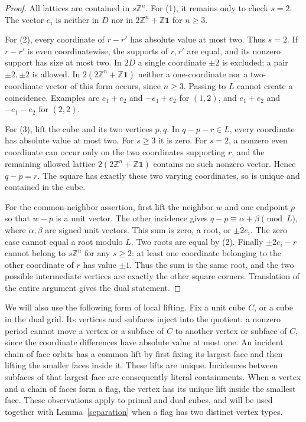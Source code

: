\documentclass[11pt,a4paper]{article}
\newcommand{\Z}{\mathbb Z}
\newcommand{\one}{\mathbf1}
\begin{document}
\begin{proof}
All lattices are contained in $s\Z^n$. For (1), it remains only to
check $s=2$. The vector $e_i$ is neither in $D$ nor in
$2\Z^n+\Z\one$ for $n\ge3$.

For (2), every coordinate of $r-r'$ has absolute value at most two.
Thus $s=2$. If $r-r'$ is even coordinatewise, the supports of $r,r'$
are equal, and its nonzero support has size at most two. In $2D$ a
single coordinate $\pm2$ is excluded; a pair $\pm2,\pm2$ is allowed.
In $2(2\Z^n+\Z\one)$ neither a one-coordinate nor a two-coordinate
vector of this form occurs, since $n\ge3$. Passing to $L$ cannot
create a coincidence. Examples are $e_1+e_2$ and $-e_1+e_2$ for
$(1,2)$, and $e_1+e_2$ and $-e_1-e_2$ for $(2,2)$.

For (3), lift the cube and its two vertices $p,q$. In
$q-p-r\in L$, every coordinate has absolute value at most two.
For $s\ge3$ it is zero. For $s=2$, a nonzero even coordinate
can occur only on the two coordinates supporting $r$, and the
remaining allowed lattice $2(2\Z^n+\Z\one)$ contains no such
nonzero vector. Hence $q-p=r$. The square has exactly these two
varying coordinates, so is unique and contained in the cube.

For the common-neighbor assertion, first lift the neighbor $w$ and
one endpoint $p$ so that $w-p$ is a unit vector. The other incidence
gives $q-p\equiv\alpha+\beta\pmod L$, where $\alpha,\beta$ are
signed unit vectors. This sum is zero, a root, or $\pm2e_i$.
The zero case cannot equal a root modulo $L$. Two roots are equal
by (2). Finally $\pm2e_i-r$ cannot belong to $s\Z^n$ for any
$s\ge2$: at least one coordinate belonging to the other coordinate
of $r$ has value $\pm1$. Thus the sum is the same root, and the
two possible intermediate vertices are exactly the other square
corners. Translation of the entire argument gives the dual statement.
\end{proof}

We will also use the following form of local lifting. Fix a unit cube
$C$, or a cube in the dual grid. Its vertices and subfaces inject into
the quotient: a nonzero period cannot move a vertex or a subface of
$C$ to another vertex or subface of $C$, since the coordinate
differences have absolute value at most one. An incident chain of
face orbits has a common lift by first fixing its largest face and
then lifting the smaller faces inside it. These lifts are unique.
Incidences between subfaces of that largest face are consequently
literal containments. When a vertex and a chain of faces form a flag,
the vertex has its unique lift inside the smallest face. These
observations apply to primal and dual cubes, and will be used together
with Lemma~\ref{separation} when a flag has two distinct vertex types.
\end{document}
